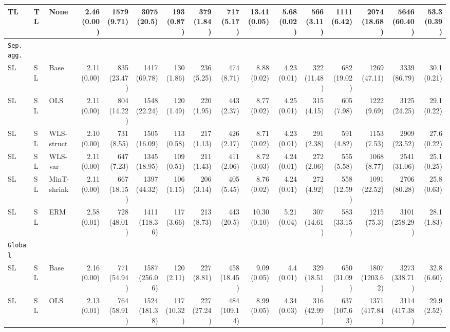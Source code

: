 \documentclass[preprint, 3p, times, twocolumn]{elsarticle}
\begin{document}
\begin{table}
\begin{center}
{{\begin{tabular}{l l l rrrrrrrrrrrrr}
  \hspace{0.1cm} 	TL	&TL	&None	&2.46 (0.00)	&1579 (9.71)	&3075 (20.5)	&193 (0.87)	&379 (1.84)	&717 (5.17)	&13.41 (0.05)	&5.68 (0.02)	&566 (3.11)	&1111 (6.42)	&2074 (18.68)	&5646 (60.40)	&53.3 (0.39)	\\
  \midrule																	
  \texttt{Sep. agg.}																	\\
  \hspace{0.1cm} 	SL	&SL	&Base	&2.11 (0.00)	&835 (23.47)	&1417 (69.78)	&130 (1.86)	&236 (5.25)	&474 (8.71)	&8.88 (0.02)	&4.23 (0.01)	&322 (11.48)	&682 (19.02)	&1269 (47.11)	&3339 (86.79)	&30.1 (0.21)	\\
  \hspace{0.1cm} 	SL	&SL	&OLS	&2.11 (0.00)	&804 (14.22)	&1548 (22.24)	&120 (1.49)	&220 (1.95)	&443 (2.37)	&8.77 (0.02)	&4.25 (0.01)	&315 (4.15)	&605 (7.98)	&1222 (9.69)	&3125 (24.25)	&29.1 (0.22)	\\
  \hspace{0.1cm} 	SL	&SL	&WLS-struct	&2.10 (0.00)	&731 (8.55)	&1505 (16.09)	&113 (0.58)	&217 (1.13)	&426 (2.17)	&8.71 (0.02)	&4.23 (0.01)	&291 (2.38)	&591 (4.82)	&1153 (7.53)	&2909 (23.52)	&27.6 (0.22)	\\
  \hspace{0.1cm} 	SL	&SL	&WLS-var	&2.11 (0.00)	&647 (7.23)	&1345 (18.95)	&109 (0.51)	&211 (1.43)	&411 (2.06)	&8.72 (0.03)	&4.24 (0.01)	&272 (2.06)	&555 (5.58)	&1068 (8.77)	&2541 (31.06)	&25.1 (0.25)	\\
  \hspace{0.1cm} 	SL	&SL	&MinT-shrink	&2.11 (0.00)	&667 (18.15)	&1397 (44.32)	&106 (1.15)	&206 (3.14)	&405 (5.45)	&8.76 (0.02)	&4.24 (0.01)	&272 (4.92)	&558 (12.59)	&1091 (22.52)	&2706 (80.28)	&25.8 (0.63)	\\
  \hspace{0.1cm} 	SL	&SL	&ERM	&2.58 (0.01)	&728 (48.01)	&1411 (118.36)	&117 (3.66)	&213 (8.73)	&443 (20.5)	&10.30 (0.10)	&5.21 (0.04)	&307 (14.61)	&583 (33.15)	&1215 (75.3)	&3101 (258.29)	&28.1 (1.83)	\\
  \midrule																	
  \texttt{Global}																	\\
  \hspace{0.1cm} 	SL	&SL	&Base	&2.16 (0.00)	&771 (54.94)	&1587 (256.06)	&120 (2.11)	&227 (8.81)	&458 (18.45)	&9.09 (0.05)	&4.4 (0.01)	&329 (18.51)	&650 (31.09)	&1807 (1203.62)	&3273 (338.71)	&32.8 (6.60)	\\
  \hspace{0.1cm} 	SL	&SL	&OLS	&2.13 (0.01)	&764 (58.91)	&1524 (181.38)	&117 (10.32)	&227 (27.24)	&484 (109.14)	&8.99 (0.05)	&4.34 (0.03)	&316 (42.99)	&637 (107.63)	&1371 (417.84)	&3114 (417.38)	&29.9 (2.52)	\\

\end{tabular}}}
\end{center}
\end{table}
\end{document}
